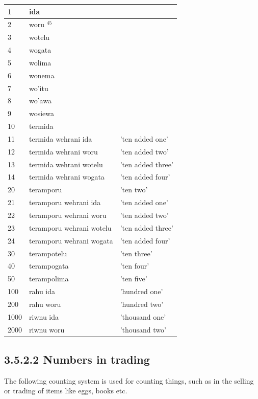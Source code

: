 \documentclass[10pt]{article}
\begin{document}
\begin{center}
\begin{tabular}{|l|l|l|}
\hline
1 & ida &  \\
\hline
2 & woru \({ }^{45}\) &  \\
\hline
3 & wotelu &  \\
\hline
4 & wogata &  \\
\hline
5 & wolima &  \\
\hline
6 & wonema &  \\
\hline
7 & wo'itu &  \\
\hline
8 & wo'awa &  \\
\hline
9 & wosiewa &  \\
\hline
10 & termida &  \\
\hline
11 & termida wehrani ida & 'ten added one' \\
\hline
12 & termida wehrani woru & 'ten added two' \\
\hline
13 & termida wehrani wotelu & 'ten added three' \\
\hline
14 & termida wehrani wogata & 'ten added four' \\
\hline
20 & teramporu & 'ten two' \\
\hline
21 & teramporu wehrani ida & 'ten added one' \\
\hline
22 & teramporu wehrani woru & 'ten added two' \\
\hline
23 & teramporu wehrani wotelu & 'ten added three' \\
\hline
24 & teramporu wehrani wogata & 'ten added four' \\
\hline
30 & terampotelu & 'ten three' \\
\hline
40 & terampogata & 'ten four' \\
\hline
50 & terampolima & 'ten five' \\
\hline
100 & rahu ida & 'hundred one' \\
\hline
200 & rahu woru & 'hundred two' \\
\hline
1000 & riwnu ida & 'thousand one' \\
\hline
2000 & riwnu woru & 'thousand two' \\
\hline
\end{tabular}
\end{center}

\subsection*{3.5.2.2 Numbers in trading}
The following counting system is used for counting things, such as in the selling or trading of items like eggs, books etc.
\end{document}
